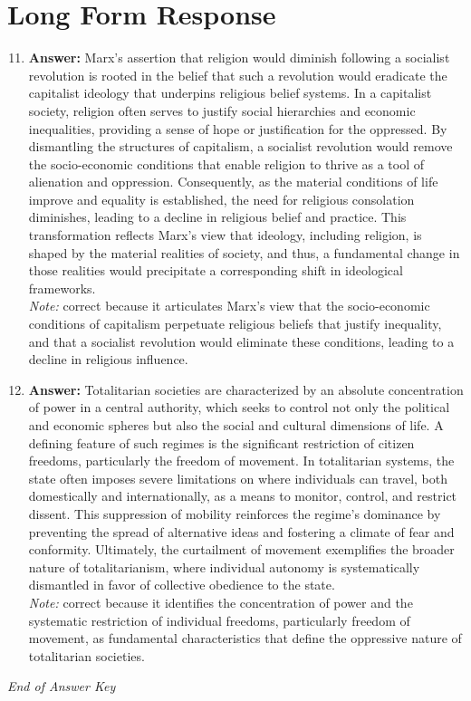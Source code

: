 \documentclass[12pt]{article}
\begin{document}
\section*{Long Form Response}
\begin{enumerate}[label=\arabic*.]
\setcounter{enumi}{10}
\item \textbf{Answer:} Marx's assertion that religion would diminish following a socialist revolution is rooted in the belief that such a revolution would eradicate the capitalist ideology that underpins religious belief systems. In a capitalist society, religion often serves to justify social hierarchies and economic inequalities, providing a sense of hope or justification for the oppressed. By dismantling the structures of capitalism, a socialist revolution would remove the socio-economic conditions that enable religion to thrive as a tool of alienation and oppression. Consequently, as the material conditions of life improve and equality is established, the need for religious consolation diminishes, leading to a decline in religious belief and practice. This transformation reflects Marx's view that ideology, including religion, is shaped by the material realities of society, and thus, a fundamental change in those realities would precipitate a corresponding shift in ideological frameworks.
\\ \textit{Note:} correct because it articulates Marx's view that the socio-economic conditions of capitalism perpetuate religious beliefs that justify inequality, and that a socialist revolution would eliminate these conditions, leading to a decline in religious influence.
\item \textbf{Answer:} Totalitarian societies are characterized by an absolute concentration of power in a central authority, which seeks to control not only the political and economic spheres but also the social and cultural dimensions of life. A defining feature of such regimes is the significant restriction of citizen freedoms, particularly the freedom of movement. In totalitarian systems, the state often imposes severe limitations on where individuals can travel, both domestically and internationally, as a means to monitor, control, and restrict dissent. This suppression of mobility reinforces the regime's dominance by preventing the spread of alternative ideas and fostering a climate of fear and conformity. Ultimately, the curtailment of movement exemplifies the broader nature of totalitarianism, where individual autonomy is systematically dismantled in favor of collective obedience to the state.
\\ \textit{Note:} correct because it identifies the concentration of power and the systematic restriction of individual freedoms, particularly freedom of movement, as fundamental characteristics that define the oppressive nature of totalitarian societies.
\end{enumerate}

\vfill
\noindent\textit{End of Answer Key}
\end{document}
